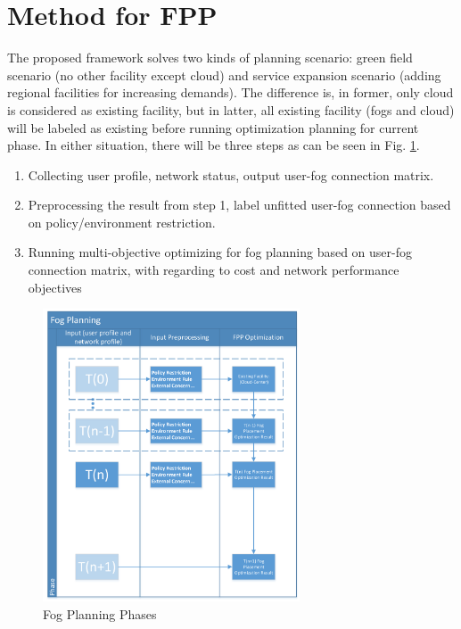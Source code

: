 \documentclass[10pt,journal,compsoc]{IEEEtran}
\begin{document}
\section{Method for FPP}
The proposed framework solves two kinds of planning scenario: green field scenario (no other facility except cloud) and service expansion scenario (adding regional facilities for increasing demands). The difference is, in former, only cloud is considered as existing facility, but in latter, all existing facility (fogs and cloud) will be labeled as existing before running optimization planning for current phase. In either situation, there will be three steps as can be seen in Fig. \ref{fpphase}. 
\begin{enumerate}
\item Collecting user profile, network status, output user-fog connection matrix.
\item Preprocessing the result from step 1, label unfitted user-fog connection based on policy/environment restriction.
\item Running multi-objective optimizing for fog planning based on user-fog connection matrix, with regarding to cost and network performance objectives 
\end{enumerate}
\begin{figure}[t]
\centerline{\includegraphics[width=3.0in]{Fogplanningmethod.png}}
\caption{Fog Planning Phases} 
\label{fpphase}
\end{figure}
\end{document}

